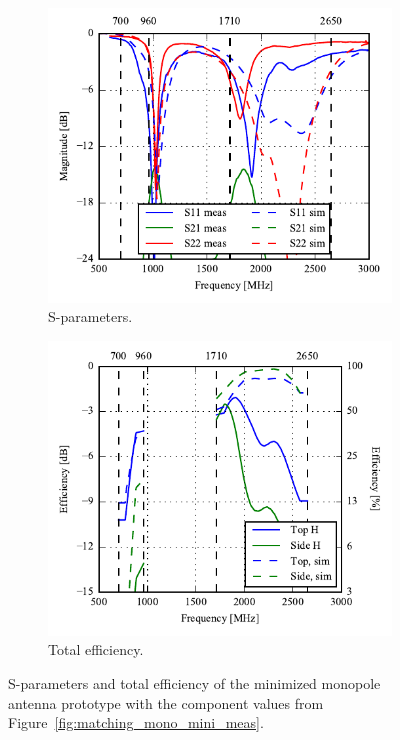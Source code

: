 \begin{figure}[htbp]
    \centering
    \begin{subfigure}{0.49\linewidth}
        \includegraphics{img/tech_sol/monopole/5mm/sparams_comp.pdf}
        \caption{S-parameters.}
    \end{subfigure}
    \hfill
    \begin{subfigure}{0.49\linewidth}
        \includegraphics{img/tech_sol/monopole/5mm/eff_comp.pdf}
        \caption{Total efficiency.}
    \end{subfigure}
    \caption{S-parameters and total efficiency of the minimized monopole antenna prototype with the component values from Figure~\ref{fig:matching_mono_mini_meas}.}
    \label{fig:mono_proto_sparam_eff}
\end{figure}


